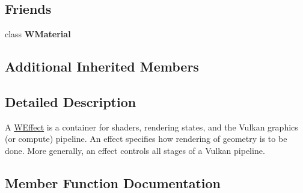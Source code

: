 \subsection*{Friends}
\begin{DoxyCompactItemize}
\item 
class {\bfseries W\+Material}\hypertarget{class_w_effect_a82829be2ace0f839dd132dface8a4da3}{}\label{class_w_effect_a82829be2ace0f839dd132dface8a4da3}

\end{DoxyCompactItemize}
\subsection*{Additional Inherited Members}


\subsection{Detailed Description}
A \hyperlink{class_w_effect}{W\+Effect} is a container for shaders, rendering states, and the Vulkan graphics (or compute) pipeline. An effect specifies how rendering of geometry is to be done. More generally, an effect controls all stages of a Vulkan pipeline. 

\subsection{Member Function Documentation}
